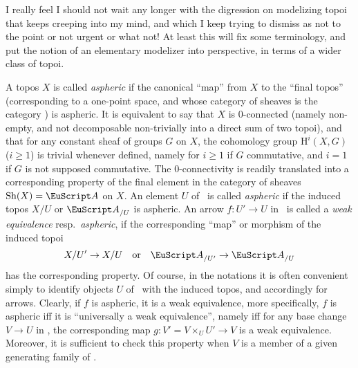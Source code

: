 \bigbreak

\presectionfill{}\par

\label{sec:35}%
I really feel I should not wait any longer with the digression on
modelizing topoi that keeps creeping into my mind, and which I keep
trying to dismiss as not to the point or not urgent or what not! At
least this will fix some terminology, and put the notion of an
elementary modelizer into perspective, in terms of a wider class of
topoi.

A topos $X$ is called \emph{aspheric} if the canonical ``map'' from
$X$ to the ``final topos'' (corresponding to a one-point space, and
whose category of sheaves is the category \Sets) is aspheric. It is
equivalent to say that $X$ is $0$-connected (namely non-empty, and not
decomposable non-trivially into a direct sum of two topoi), and that
for any constant sheaf of groups $G$ on $X$, the
cohomology group $\mathrm H^i(X,G)$ ($i\ge1$) is trivial whenever defined,
namely for $i\ge1$ if $G$ commutative, and $i=1$ if $G$ is not
supposed commutative. The $0$-connectivity is readily translated into
a corresponding property of the final element in the category of
sheaves $\Sh(X)=\scrA$ on $X$. An element $U$ of \scrA\ is called
\emph{aspheric} if the induced topos $X/U$ or $\scrA_{/U}$ is
aspheric. An arrow $f : U' \to U$ in \scrA\ is called a \emph{weak
  equivalence} resp.\ \emph{aspheric}, if the corresponding ``map'' or
morphism of the induced topoi
\[ X/U'\to X/U \quad\text{or}\quad \scrA_{/U'}\to\scrA_{/U} \]
has the corresponding property. Of course, in the notations it is
often convenient simply to identify objects $U$ of \scrA\ with the
induced topos, and accordingly for arrows. Clearly, if $f$ is aspheric,
it is a weak equivalence, more specifically, $f$ is aspheric if{f} it
is ``universally a weak equivalence'', namely if{f} for any base
change $V\to U$ in \scrA, the corresponding map $g: V'=V\times_U U'\to
V$ is a weak equivalence. Moreover, it is sufficient to check this
property when $V$ is a member of a given generating family of \scrA.

